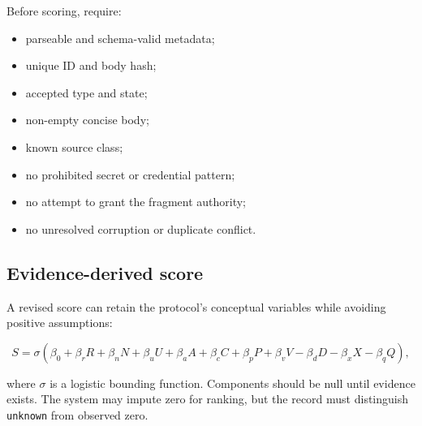 \documentclass[11pt,a4paper]{article}
\begin{document}
Before scoring, require:

\begin{itemize}
  \item parseable and schema-valid metadata;
  \item unique ID and body hash;
  \item accepted type and state;
  \item non-empty concise body;
  \item known source class;
  \item no prohibited secret or credential pattern;
  \item no attempt to grant the fragment authority;
  \item no unresolved corruption or duplicate conflict.
\end{itemize}

\subsection{Evidence-derived score}

A revised score can retain the protocol's conceptual variables while avoiding positive assumptions:

\begin{equation}
S = \sigma\left(
\beta_0 +
\beta_r R +
\beta_n N +
\beta_u U +
\beta_a A +
\beta_c C +
\beta_p P +
\beta_v V -
\beta_d D -
\beta_x X -
\beta_q Q
\right),
\end{equation}

where \(\sigma\) is a logistic bounding function. Components should be null until evidence exists. The system may impute zero for ranking, but the record must distinguish \texttt{unknown} from observed zero.
\end{document}
